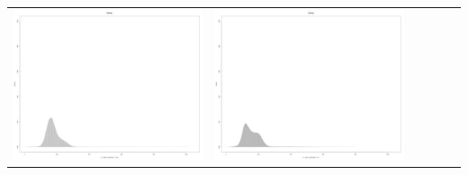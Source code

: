 \begin{table}[htbp]
{\begin{tabular}{l | ccccc}
\begin{minipage}{.15\textwidth}
     			 	\includegraphics[width=\linewidth]{images/mema-dens-graph/N4}
    				 \end{minipage}
    			   &	 \begin{minipage}{.15\textwidth}\vspace{2pt}     							
     			 	\includegraphics[width=\linewidth]{images/mema-dens-graph/N8}
    				 \end{minipage}
    			   &	 \begin{minipage}{.15\textwidth}\vspace{2pt}     							

\end{minipage}
\end{tabular}}
\end{table}
